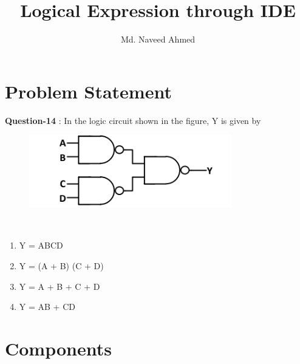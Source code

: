 \documentclass[journal,12pt,twocolumn]{IEEEtran}
\begin{document}
%

\theoremstyle{definition}
\newtheorem{theorem}{Theorem}[section]
\newtheorem{problem}{Problem}
\newtheorem{proposition}{Proposition}[section]
\newtheorem{lemma}{Lemma}[section]
\newtheorem{corollary}[theorem]{Corollary}
\newtheorem{example}{Example}[section]
\newtheorem{definition}{Definition}[section]
\newcommand{\BEQA}{\begin{eqnarray}}
\newcommand{\EEQA}{\end{eqnarray}}
\newcommand{\define}{\stackrel{\triangle}{=}}
\vspace{2cm}
\title{ 
Logical Expression through IDE
}

\author{Md. Naveed Ahmed}


\maketitle
\tableofcontents
\bigskip
%
\section{Problem Statement}



\textbf{Question-14}  : In the logic circuit shown in the figure, Y is given by
\begin{figure}[h]
    \centering
    \includegraphics[scale=0.8]{../figures/log_exp.png}\\
\end{figure}\\
\begin{enumerate}[label=(\alph*)]
    \item Y = ABCD
    \item Y = (A + B) (C + D)
    \item Y = A + B + C + D
    \item Y = AB + CD
\end{enumerate}

\section{\textbf{Components}}

\begin{table}[!h]
\centering
\caption{}
\label{table:7447_disp}
\end{table}
\end{document}
